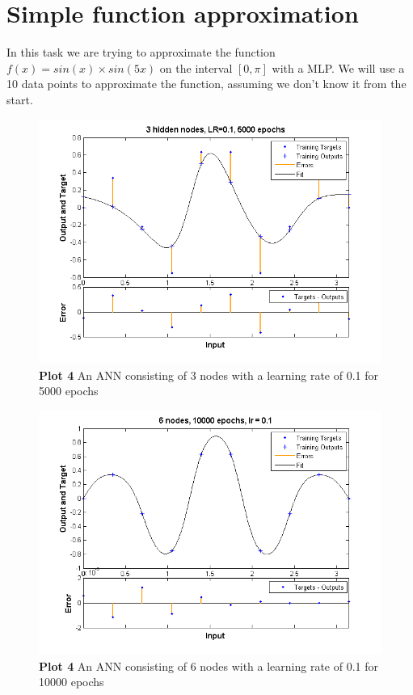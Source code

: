 \documentclass[a4paper]{article}
\begin{document}
\section{Simple function approximation}
In this task we are trying to approximate the function $f(x) = sin(x) \times sin(5x)$ on the interval $[0, \pi]$ with a MLP. We will use a 10 data points to approximate the function, assuming we don't know it from the start. 
\begin{figure}[H] %
	\includegraphics[scale=0.8]{plot4_3nodes.png}
	\caption{\label{fig:plot4_3nodes.png}\textbf{Plot 4} An ANN consisting of 3 nodes with a learning rate of 0.1 for 5000 epochs}
\end{figure}
\begin{figure}[H] %
	\includegraphics[scale=0.8]{plot4_6nodes.png}
	\caption{\label{fig:plot4_6nodes.png}\textbf{Plot 4} An ANN consisting of 6 nodes with a learning rate of 0.1 for 10000 epochs}
\end{figure}
\end{document}
